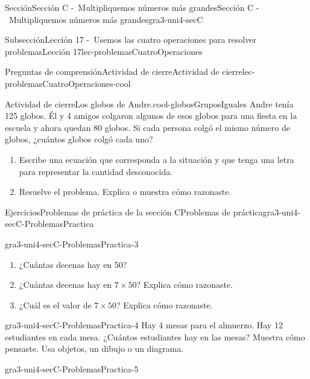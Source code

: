 \documentclass[twoside,10pt,]{article}
\begin{document}
\begin{sectionptx}{Sección}{Sección C -~Multipliquemos números más grandes}{}{Sección C -~Multipliquemos números más grandes}{}{}{gra3-uni4-secC}
\begin{subsectionptx}{Subsección}{Lección 17 -~Usemos las cuatro operaciones para resolver problemas}{}{Lección 17}{}{}{lec-problemasCuatroOperaciones}
\begin{reading-questions-subsubsection}{Preguntas de comprensión}{Actividad de cierre}{}{Actividad de cierre}{}{}{lec-problemasCuatroOperaciones-cool}
\begin{project}{Actividad de cierre}{Los globos de Andre.}{cool-globosGruposIguales}%
Andre tenía 125 globos. Él y 4 amigos colgaron algunos de esos globos para una fiesta en la escuela y ahora quedan 80 globos. Si cada persona colgó el mismo número de globos, ¿cuántos globos colgó cada uno?%
%
\begin{enumerate}[label={(\alph*)}]
\item{}Escribe una ecuación que corresponda a la situación y que tenga una letra para representar la cantidad desconocida.%
\item{}Resuelve el problema. Explica o muestra cómo razonaste.%
\end{enumerate}
\end{project}%
\end{reading-questions-subsubsection}
\end{subsectionptx}
%
%
\typeout{************************************************}
\typeout{************************************************}
%
\begin{exercises-subsection}{Ejercicios}{Problemas de práctica de la sección C}{}{Problemas de práctica}{}{}{gra3-uni4-secC-ProblemasPractica}
\begin{divisionexercise}{1}{}{}{gra3-uni4-secC-ProblemasPractica-3}%
%
\begin{enumerate}[label={(\alph*)}]
\item{}¿Cuántas decenas hay en 50?%
\item{}¿Cuántas decenas hay en \(7 \times 50\)? Explica cómo razonaste.%
\item{}¿Cuál es el valor de \(7 \times 50\)? Explica cómo razonaste.%
\end{enumerate}
\end{divisionexercise}%
\begin{divisionexercise}{2}{}{}{gra3-uni4-secC-ProblemasPractica-4}%
Hay 4 mesas para el almuerzo. Hay 12 estudiantes en cada mesa. ¿Cuántos estudiantes hay en las mesas? Muestra cómo pensaste. Usa objetos, un dibujo o un diagrama.%
\end{divisionexercise}%
\begin{divisionexercise}{3}{}{}{gra3-uni4-secC-ProblemasPractica-5}%
\begin{sidebyside}{2}{0.0125}{0.0125}{0.025}%
\begin{sbspanel}{0.35}%

\end{sbspanel}
\end{sidebyside}
\end{divisionexercise}
\end{exercises-subsection}
\end{sectionptx}
\end{document}
